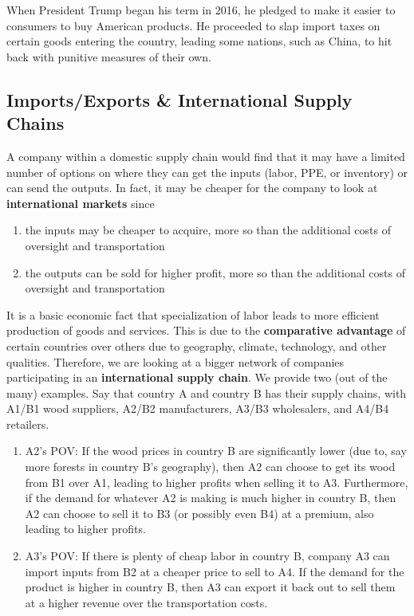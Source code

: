 \documentclass{article}
\begin{document}
  \begin{example}
    When President Trump began his term in 2016, he pledged to make it easier to consumers to buy American products. He proceeded to slap import taxes on certain goods entering the country, leading some nations, such as China, to hit back with punitive measures of their own. 
  \end{example}

  \subsection{Imports/Exports \& International Supply Chains}

    A company within a domestic supply chain would find that it may have a limited number of options on where they can get the inputs (labor, PPE, or inventory) or can send the outputs. In fact, it may be cheaper for the company to look at \textbf{international markets} since

    \begin{enumerate}
      \item the inputs may be cheaper to acquire, more so than the additional costs of oversight and transportation
      \item the outputs can be sold for higher profit, more so than the additional costs of oversight and transportation
    \end{enumerate}

    It is a basic economic fact that specialization of labor leads to more efficient production of goods and services. This is due to the \textbf{comparative advantage} of certain countries over others due to geography, climate, technology, and other qualities. Therefore, we are looking at a bigger network of companies participating in an \textbf{international supply chain}. We provide two (out of the many) examples. Say that country A and country B has their supply chains, with A1/B1 wood suppliers, A2/B2 manufacturers, A3/B3 wholesalers, and A4/B4 retailers.

    \begin{enumerate}
      \item A2's POV: If the wood prices in country B are significantly lower (due to, say more forests in country B's geography), then A2 can choose to get its wood from B1 over A1, leading to higher profits when selling it to A3. Furthermore, if the demand for whatever A2 is making is much higher in country B, then A2 can choose to sell it to B3 (or possibly even B4) at a premium, also leading to higher profits.
      \item A3's POV: If there is plenty of cheap labor in country B, company A3 can import inputs from B2 at a cheaper price to sell to A4. If the demand for the product is higher in country B, then A3 can export it back out to sell them at a higher revenue over the transportation costs.
    \end{enumerate}
\end{document}

